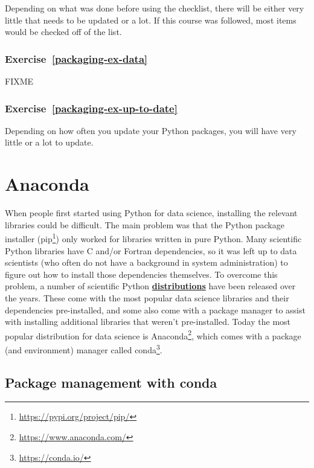 \documentclass[
]{krantz}
\renewcommand{\href}[2]{#2\footnote{\url{#1}}}
\newcommand{\gref}[2]{\hyperlink{#2}{\textbf{#1}}}
\begin{document}
Depending on what was done before using the checklist, there will be either
very little that needs to be updated or a lot. If this course was followed,
most items would be checked off of the list.

\hypertarget{exercise-refpackaging-ex-data}{%
\subsection*{Exercise~\ref{packaging-ex-data}}\label{exercise-refpackaging-ex-data}}


FIXME

\hypertarget{exercise-refpackaging-ex-up-to-date}{%
\subsection*{Exercise~\ref{packaging-ex-up-to-date}}\label{exercise-refpackaging-ex-up-to-date}}


Depending on how often you update your Python packages, you will have very little
or a lot to update.

\hypertarget{anaconda}{%
\chapter{Anaconda}\label{anaconda}}

When people first started using Python for data science,
installing the relevant libraries could be difficult.
The main problem was that the Python package installer (\href{https://pypi.org/project/pip/}{pip})
only worked for libraries written in pure Python.
Many scientific Python libraries have C and/or Fortran dependencies,
so it was left up to data scientists
(who often do not have a background in system administration)
to figure out how to install those dependencies themselves.
To overcome this problem,
a number of scientific Python \gref{distributions}{software\_distribution}
have been released over the years.
These come with the most popular data science libraries and their dependencies pre-installed,
and some also come with a package manager to assist
with installing additional libraries that weren't pre-installed.
Today the most popular distribution for data science is \href{https://www.anaconda.com/}{Anaconda},
which comes with a package (and environment) manager called \href{https://conda.io/}{conda}.

\hypertarget{anaconda-conda-package-management}{%
\section{Package management with conda}\label{anaconda-conda-package-management}}
\end{document}
